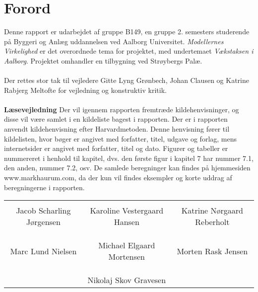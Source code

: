\chapter*{Forord}
Denne rapport er udarbejdet af gruppe B149, en gruppe 2. semesters studerende på Byggeri og Anlæg uddannelsen ved Aalborg Universitet. \textit{Modellernes Virkelighed} er det overordnede tema for projektet, med undertemaet \textit{Vækstaksen i Aalborg}. Projektet omhandler en tilbygning ved Strøybergs Palæ.
\\
\\
Der rettes stor tak til vejledere Gitte Lyng Grønbech, Johan Clausen og Katrine Rabjerg Meltofte for vejledning og konstruktiv kritik. 
\\
\\
\textbf{Læsevejledning}
\newline
Der vil igennem rapporten fremtræde kildehenvisninger, og disse vil være samlet i en kildeliste bagest i rapporten. Der er i rapporten anvendt kildehenvisning efter Harvardmetoden. Denne henvisning fører til kildelisten, hvor bøger er angivet med forfatter, titel, udgave og forlag, mens internetsider er angivet med forfatter, titel og dato. Figurer og tabeller er nummereret i henhold til kapitel, dvs. den første figur i kapitel 7 har nummer 7.1, den anden, nummer 7.2, osv. De samlede beregninger kan ﬁndes på hjemmesiden www.markhaurum.com, da der kun vil ﬁndes eksempler og korte uddrag af beregningerne i rapporten.


\phantom{Luft}

\phantom{Luft}

\begin{table}[H]
	\centering
		\begin{tabular}{c c c}
			\underline{\phantom{mmmmmmmmmmmmmm}} & \underline{\phantom{mmmmmmmmmmmmmm}} & \underline{\phantom{mmmmmmmmmmmmmm}} \\
			Jacob Scharling Jørgensen			& Karoline Vestergaard Hansen 		& Katrine Nørgaard Reberholt 			\\
			&&\\
			&&\\
			\underline{\phantom{mmmmmmmmmmmmmm}} & \underline{\phantom{mmmmmmmmmmmmmm}} & \underline{\phantom{mmmmmmmmmmmmmm}} \\
			Marc Lund Nielsen			& Michael Elgaard Mortensen 		& Morten Rask Jensen 				\\
			&&\\
			&&\\
		& \underline{\phantom{mmmmmmmmmmmmmm}} 	&			\\														
		& Nikolaj Skov Gravesen 							& 					
		\end{tabular}
\end{table}